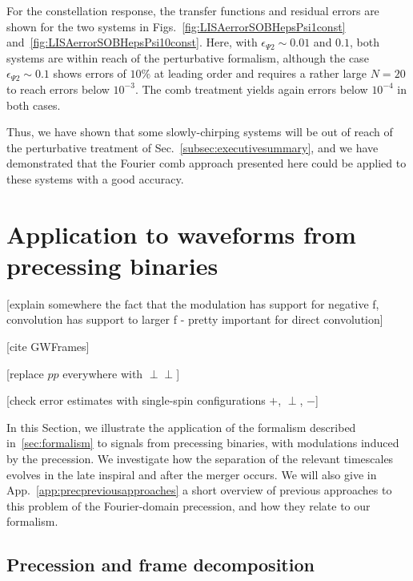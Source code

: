 \documentclass[aps,showpacs,twocolumn,
prd,superscriptaddress,nofootinbib]{revtex4-1}
\newcommand{\SM}[1]{{\color{Red} #1}}
\begin{document}
For the constellation response, the transfer functions and residual errors are shown for the two systems in Figs.~\ref{fig:LISAerrorSOBHepsPsi1const} and~\ref{fig:LISAerrorSOBHepsPsi10const}. Here, with $\epsilon_{\Psi 2} \sim 0.01$ and $0.1$, both systems are within reach of the perturbative formalism, although the case  $\epsilon_{\Psi 2} \sim 0.1$ shows errors of $10\%$ at leading order and requires a rather large $N=20$ to reach errors below $10^{-3}$. The comb treatment yields again errors below $10^{-4}$ in both cases.

Thus, we have shown that some slowly-chirping systems will be out of reach of the perturbative treatment of Sec.~\ref{subsec:executivesummary}, and we have demonstrated that the Fourier comb approach presented here could be applied to these systems with a good accuracy.


\section{Application to waveforms from precessing binaries}
\label{sec:precession}

\SM{[explain somewhere the fact that the modulation has support for negative f, convolution has support to larger f - pretty important for direct convolution]}

\SM{[cite GWFrames]}

\SM{[replace $pp$ everywhere with $\perp\perp$]}

\SM{[check error estimates with single-spin configurations $+$, $\perp$, $-$]}

In this Section, we illustrate the application of the formalism described in~\ref{sec:formalism} to signals from precessing binaries, with modulations induced by the precession. We investigate how the separation of the relevant timescales evolves in the late inspiral and after the merger occurs. We will also give in App.~\ref{app:precpreviousapproaches} a short overview of previous approaches to this problem of the Fourier-domain precession, and how they relate to our formalism.


\subsection{Precession and frame decomposition}
\label{subsec:precdef}
\end{document}
